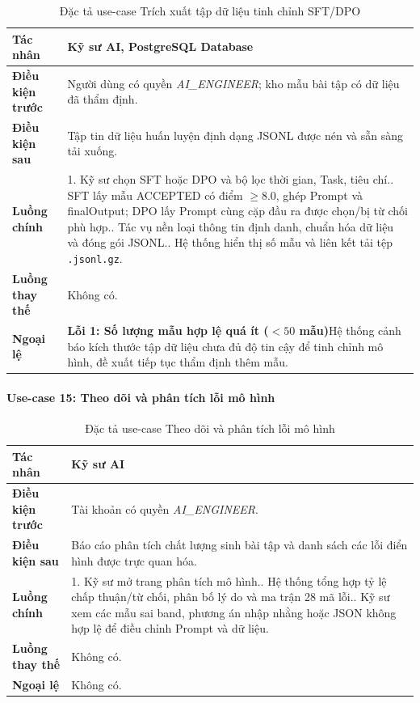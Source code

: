 \begingroup
\small
\begin{longtable}{|p{3.2cm}|p{\dimexpr\linewidth-3.2cm-4\tabcolsep-3\arrayrulewidth\relax}|}
\caption{Đặc tả use-case Trích xuất tập dữ liệu tinh chỉnh SFT/DPO}
\label{aihub:tab:uc_export_datasets}\\
\hline
\textbf{Tác nhân} & Kỹ sư AI, PostgreSQL Database \\ \hline
\textbf{Điều kiện trước} & Người dùng có quyền \textit{AI\_ENGINEER}; kho mẫu bài tập có dữ liệu đã thẩm định. \\ \hline
\textbf{Điều kiện sau} & Tập tin dữ liệu huấn luyện định dạng JSONL được nén và sẵn sàng tải xuống. \\ \hline
\textbf{Luồng chính} & 1. Kỹ sư chọn SFT hoặc DPO và bộ lọc thời gian, Task, tiêu chí.\newline 2. SFT lấy mẫu ACCEPTED có điểm $\ge 8.0$, ghép Prompt và finalOutput; DPO lấy Prompt cùng cặp đầu ra được chọn/bị từ chối phù hợp.\newline 3. Tác vụ nền loại thông tin định danh, chuẩn hóa dữ liệu và đóng gói JSONL.\newline 4. Hệ thống hiển thị số mẫu và liên kết tải tệp \texttt{.jsonl.gz}. \\ \hline
\textbf{Luồng thay thế} & Không có. \\ \hline
\textbf{Ngoại lệ} &
\textbf{Lỗi 1: Số lượng mẫu hợp lệ quá ít ($< 50$ mẫu)}\newline Hệ thống cảnh báo kích thước tập dữ liệu chưa đủ độ tin cậy để tinh chỉnh mô hình, đề xuất tiếp tục thẩm định thêm mẫu. \\ \hline
\end{longtable}
\endgroup

\paragraph{Use-case 15: Theo dõi và phân tích lỗi mô hình}

\begingroup
\small
\begin{longtable}{|p{3.2cm}|p{\dimexpr\linewidth-3.2cm-4\tabcolsep-3\arrayrulewidth\relax}|}
\caption{Đặc tả use-case Theo dõi và phân tích lỗi mô hình}
\label{aihub:tab:uc_analyze_model_errors}\\
\hline
\textbf{Tác nhân} & Kỹ sư AI \\ \hline
\textbf{Điều kiện trước} & Tài khoản có quyền \textit{AI\_ENGINEER}. \\ \hline
\textbf{Điều kiện sau} & Báo cáo phân tích chất lượng sinh bài tập và danh sách các lỗi điển hình được trực quan hóa. \\ \hline
\textbf{Luồng chính} & 1. Kỹ sư mở trang phân tích mô hình.\newline 2. Hệ thống tổng hợp tỷ lệ chấp thuận/từ chối, phân bố lý do và ma trận 28 mã lỗi.\newline 3. Kỹ sư xem các mẫu sai band, phương án nhập nhằng hoặc JSON không hợp lệ để điều chỉnh Prompt và dữ liệu. \\ \hline
\textbf{Luồng thay thế} & Không có. \\ \hline
\textbf{Ngoại lệ} & Không có. \\ \hline
\end{longtable}
\endgroup


